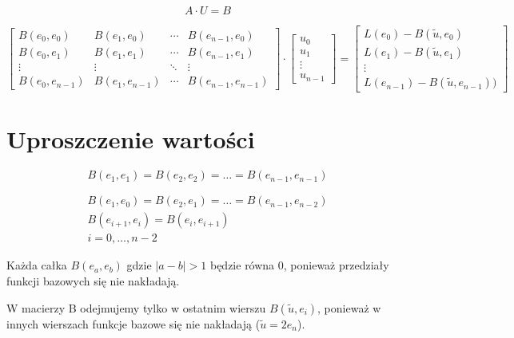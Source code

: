 \documentclass[12pt,a4paper]{mwart}
\begin{document}
\begin{equation*}
    A \cdot U=B
\end{equation*}

\begin{equation*}
    \left[
    \begin{matrix}
        B(e_0, e_0) & B(e_1, e_0) & \cdots & B(e_{n-1}, e_0) \\
        B(e_0, e_1) & B(e_1, e_1) & \cdots & B(e_{n-1}, e_1) \\
        \vdots      & \vdots & \ddots & \vdots \\
        B(e_0, e_{n-1}) & B(e_1, e_{n-1}) & \cdots & B(e_{n-1}, e_{n-1})
    \end{matrix}
    \right]
    \cdot
    \left[
    \begin{matrix}
        u_0 \\
        u_1 \\
        \vdots \\
        u_{n-1}
    \end{matrix}
    \right]
    =
    \left[
    \begin{matrix}
        L(e_0) - B(\widetilde{u}, e_0) \\
        L(e_1) - B(\widetilde{u}, e_1) \\
        \vdots \\
        L(e_{n-1}) - B(\widetilde{u}, e_{n-1}))
    \end{matrix}
    \right]
\end{equation*}

\section{Uproszczenie wartości}
\begin{equation*}
    B(e_1, e_1) = B(e_2, e_2) = \dotsc = B(e_{n-1}, e_{n-1})
\end{equation*}

\begin{equation*}
    \begin{gathered}
        B(e_1, e_0) = B(e_2, e_1) = \dotsc = B(e_{n-1}, e_{n-2}) \\
        B(e_{i+1}, e_i) = B(e_i, e_{i+1}) \\
        i = 0, \dotsc, n-2
    \end{gathered}
\end{equation*}

Każda całka $B(e_a, e_b)$ gdzie $|a-b|>1$ będzie równa 0, ponieważ przedziały
funkcji bazowych się nie nakładają.

W macierzy B odejmujemy tylko w ostatnim wierszu $B(\widetilde{u}, e_i)$, ponieważ
w innych wierszach funkcje bazowe się nie nakładają ($\widetilde{u} = 2e_n$). 
\end{document}

